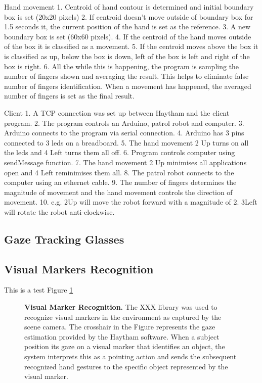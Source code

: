 \documentclass[jou,a4paper,notxfonts]{apa}
\begin{document}
Hand movement
1. Centroid of hand contour is determined and initial boundary box is set (20x20 pixels)
2. If centroid doesn't move outside of boundary box for 1.5 seconds it, the current position of the hand is set as the reference.
3. A new boundary box is set (60x60 pixels).
4. If the centroid of the hand moves outside of the box it is classified as a movement.
5. If the centroid moves above the box it is classified as up, below the box is down, left of the box is left and right of the box is right.
6. All the while this is happening, the program is sampling the number of fingers shown and averaging the result. This helps to eliminate
false number of fingers identification. When a movement has happened, the averaged number of fingers is set as the final result.

Client
1. A TCP connection was set up between Haytham and the client program.
2. The program controls an Arduino, patrol robot and computer.
3. Arduino connects to the program via serial connection.
4. Arduino has 3 pins connected to 3 leds on a breadboard.
5. The hand movement 2 Up turns on all the leds and 4 Left turns them all off.
6. Program controls computer using sendMessage function.
7. The hand movement 2 Up minimises all applications open and 4 Left reminimises them all.
8. The patrol robot connects to the computer using an ethernet cable.
9. The number of fingers determines the magnitude of movement and the hand movement controls the direction of movement.
10. e.g. 2Up will move the robot forward with a magnitude of 2. 3Left will rotate the robot anti-clockwise.

\subsection{Gaze Tracking Glasses}

\subsection{Visual Markers Recognition}

This is a test Figure \ref{visualMarker}

\begin{figure}[tp]
 \caption{\textbf{Visual Marker Recognition.} The XXX library was used to recognize visual markers in the
 environment as captured by the scene camera. The crosshair in the Figure represents the gaze estimation provided by
 the Haytham software. When a subject position  its gaze  on a visual marker that identifies an object, the system
 interprets this as a pointing action and sends the subsequent recognized hand gestures to the
 specific object represented by the visual marker.}
 \label{visualMarker}
\end{figure}
\end{document}
